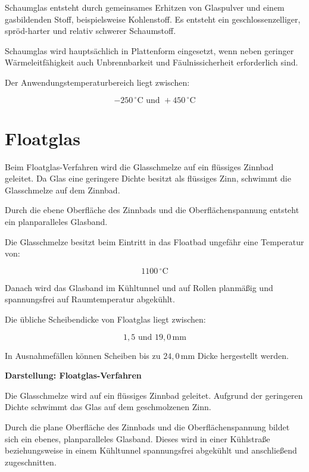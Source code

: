 \documentclass[
  12pt,
  a4paper,
  oneside
]{scrreprt}
\begin{document}
Schaumglas entsteht durch gemeinsames Erhitzen von Glaspulver und einem
gasbildenden Stoff, beispielsweise Kohlenstoff. Es entsteht ein
geschlossenzelliger, spröd-harter und relativ schwerer Schaumstoff.


Schaumglas wird hauptsächlich in Plattenform eingesetzt, wenn neben
geringer Wärmeleitfähigkeit auch Unbrennbarkeit und Fäulnissicherheit
erforderlich sind. 

Der Anwendungstemperaturbereich liegt zwischen:

\begin{equation}
  -250\,^\circ\mathrm{C}
  \text{ und }
  +450\,^\circ\mathrm{C}
\end{equation}



\section{Floatglas}

Beim Floatglas-Verfahren wird die Glasschmelze auf ein flüssiges
Zinnbad geleitet. Da Glas eine geringere Dichte besitzt als flüssiges
Zinn, schwimmt die Glasschmelze auf dem Zinnbad. 

Durch die ebene Oberfläche des Zinnbads und die Oberflächenspannung
entsteht ein planparalleles Glasband. 

Die Glasschmelze besitzt beim Eintritt in das Floatbad ungefähr eine
Temperatur von:

\begin{equation}
  1100\,^\circ\mathrm{C}
\end{equation}

Danach wird das Glasband im Kühltunnel und auf Rollen planmäßig und
spannungsfrei auf Raumtemperatur abgekühlt. 

Die übliche Scheibendicke von Floatglas liegt zwischen:

\begin{equation}
  1{,}5 \text{ und } 19{,}0\,\mathrm{mm}
\end{equation}

In Ausnahmefällen können Scheiben bis zu $24{,}0\,\mathrm{mm}$ Dicke
hergestellt werden. 

\begin{darstellungsbox}
\textbf{Darstellung: Floatglas-Verfahren}

Die Glasschmelze wird auf ein flüssiges Zinnbad geleitet. Aufgrund der
geringeren Dichte schwimmt das Glas auf dem geschmolzenen Zinn.

Durch die plane Oberfläche des Zinnbads und die Oberflächenspannung
bildet sich ein ebenes, planparalleles Glasband. Dieses wird in einer
Kühlstraße beziehungsweise in einem Kühltunnel spannungsfrei
abgekühlt und anschließend zugeschnitten.
\end{darstellungsbox}
\end{document}
